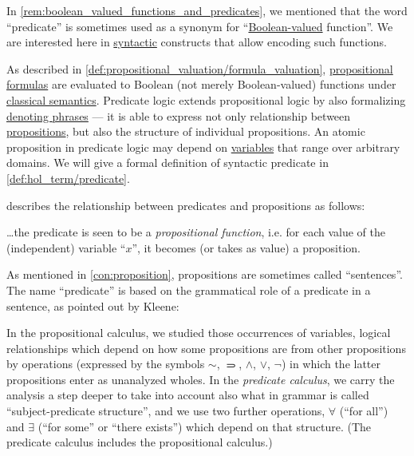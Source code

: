 \begin{remark}\label{rem:predicate_logic}
  In \cref{rem:boolean_valued_functions_and_predicates}, we mentioned that the word \enquote{predicate} is sometimes used as a synonym for \enquote{\hyperref[con:boolean_value]{Boolean-valued} function}. We are interested here in \hyperref[con:syntax_semantics_duality]{syntactic} constructs that allow encoding such functions.

  As described in \cref{def:propositional_valuation/formula_valuation}, \hyperref[def:propositional_syntax/formula]{propositional formulas} are evaluated to Boolean (not merely Boolean-valued) functions under \hyperref[def:first_order_semantics]{classical semantics}. Predicate logic extends propositional logic by also formalizing \hyperref[con:denotation]{denoting phrases} --- it is able to express not only relationship between \hyperref[con:proposition]{propositions}, but also the structure of individual propositions. An atomic proposition in predicate logic may depend on \hyperref[con:variable]{variables} that range over arbitrary domains. We will give a formal definition of syntactic predicate in \cref{def:hol_term/predicate}.

   describes the relationship between predicates and propositions as follows:
  \begin{displayquote}
    \ldots the predicate is seen to be a \textit{propositional function}, i.e. for each value of the (independent) variable \enquote{\( x \)}, it becomes (or takes as value) a proposition.
  \end{displayquote}

  As mentioned in \cref{con:proposition}, propositions are sometimes called \enquote{sentences}. The name \enquote{predicate} is based on the grammatical role of a predicate in a sentence, as pointed out by Kleene:
  \begin{displayquote}
    In the propositional calculus, we studied those occurrences of variables, logical relationships which depend on how some propositions are from other propositions by operations (expressed by the symbols \( \sim \), \( \rightimply \), \( \land \), \( \vee \), \( \neg \)) in which the latter
    propositions enter as unanalyzed wholes. In the \textit{predicate calculus}, we carry the analysis a step deeper to take into account also what in grammar is called \enquote{subject-predicate structure}, and we use two further operations, \( \forall \) (\enquote{for all}) and \( \exists \) (\enquote{for some} or \enquote{there exists}) which depend on that structure. (The predicate calculus includes the propositional calculus.)
  \end{displayquote}


\end{remark}
